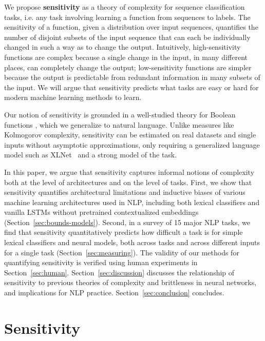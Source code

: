 \documentclass[11pt,a4paper]{article}
\begin{document}
We propose \textbf{sensitivity} as a theory of complexity for sequence classification tasks, i.e. any task involving learning a function from sequences to labels. The sensitivity of a function, given a distribution over input sequences, quantifies the number of disjoint subsets of the input sequence that can each be individually changed in such a way as to change the output.
Intuitively, high-sensitivity functions are complex because a single change in the input, in many different places, can completely change the output; low-sensitivity functions are simpler because the output is predictable from redundant information in many subsets of the input. We will argue that sensitivity predicts what tasks are easy or hard for modern machine learning methods to learn.

Our notion of sensitivity is grounded in a well-studied theory for Boolean functions \citep{odonnell2014analysis}, which we generalize to natural language.
Unlike measures like Kolmogorov complexity, sensitivity can be estimated on real datasets and single inputs without asymptotic approximations, only requiring a generalized language model such as XLNet~\citep{yang2019xlnet} and a strong model of the task.

In this paper, we argue that sensitivity captures informal notions of complexity both at the level of architectures and on the level of tasks.
First, we show that sensitivity quantifies architectural limitations and inductive biases of various machine learning architectures used in NLP, including both lexical classifiers and vanilla LSTMs without pretrained contextualized embeddings (Section~\ref{sec:bounds-models}).
Second, in a survey of 15 major NLP tasks, we find that sensitivity quantitatively predicts how difficult a task is for simple lexical classifiers and neural models, both across tasks and across different inputs for a single task (Section~\ref{sec:measuring}).
The validity of our methods for quantifying sensitivity is verified using human experiments in Section~\ref{sec:human}. Section~\ref{sec:discussion} discusses the relationship of sensitivity to previous theories of complexity and brittleness in neural networks, and implications for NLP practice. Section~\ref{sec:conclusion} concludes.






\section{Sensitivity}
\end{document}
